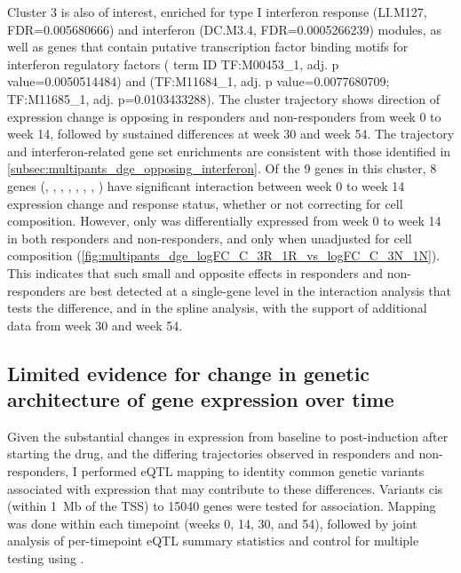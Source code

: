 Cluster 3 is also of interest, enriched for type I interferon response (LI.M127, FDR=\num{0.005680666}) and interferon (DC.M3.4, FDR=\num{0.0005266239}) modules,
as well as genes that contain putative transcription factor binding motifs for interferon regulatory factors  ( term ID TF:M00453\_1, adj. p value=\num{0.0050514484}) 
and  (TF:M11684\_1, adj. p value=\num{0.0077680709}; TF:M11685\_1, adj. p=\num{0.0103433288}).
The cluster trajectory shows direction of expression change is opposing in responders and non-responders from week 0 to week 14, followed by sustained differences at week 30 and week 54.
The trajectory and interferon-related gene set enrichments are consistent with those identified in \autoref{subsec:multipants_dge_opposing_interferon}.
Of the 9 genes in this cluster, 8 genes (, , , , , , , )
have significant interaction between week 0 to week 14 expression change and response status,
whether or not correcting for cell composition.
However, only  was differentially expressed from week 0 to week 14 in both responders and non-responders,
and only when unadjusted for cell composition (\autoref{fig:multipants_dge_logFC_C_3R_1R_vs_logFC_C_3N_1N}).
This indicates that such small and opposite effects in responders and non-responders are best detected at a single-gene level in the interaction analysis that tests the difference,
and in the spline analysis, with the support of additional data from week 30 and week 54.

    
\subsection{Limited evidence for change in genetic architecture of gene expression over time}

Given the substantial changes in expression from baseline to post-induction after starting the drug, and the differing trajectories observed in responders and non-responders, 
I performed \gls{eQTL} mapping to identity common genetic variants associated with expression that may contribute to these differences.
Variants cis (within \SI{1}{\mega b} of the TSS) to 15040 genes were tested for association.
Mapping was done within each timepoint (weeks 0, 14, 30, and 54),
followed by joint analysis of per-timepoint \gls{eQTL} summary statistics and control for multiple testing using .

